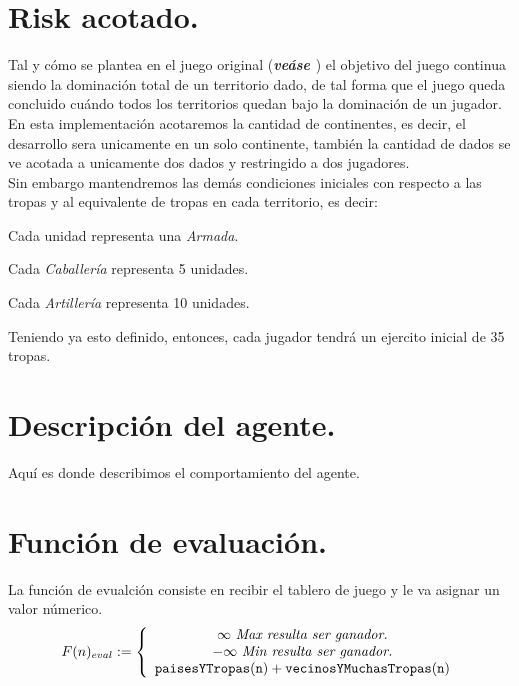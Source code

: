 \documentclass[12pt,twocolumn,draft]{article}
\begin{document}
\section{Risk acotado.}

Tal y c\'omo se plantea en el juego original (\textbf{\textit{ve\'ase \cite{RISK}}}) el objetivo del juego continua siendo la dominaci\'on total de un territorio dado, de tal forma
que el juego queda concluido cu\'ando todos los territorios quedan bajo la dominaci\'on de 
un jugador.\\
En esta implementaci\'on acotaremos la cantidad de continentes, es decir, el desarrollo sera unicamente en un solo continente, tambi\'en la cantidad de dados se ve acotada a unicamente dos dados y restringido a dos jugadores.\\

Sin embargo mantendremos las dem\'as condiciones iniciales con respecto a las tropas y al equivalente de tropas en cada territorio, es decir:
\begin{list}{*}{}
\item Cada unidad representa una \textit{Armada}.
\item Cada \textit{Caballer\'ia} representa 5 unidades.
\item Cada \textit{Artiller\'ia} representa 10 unidades.
\end{list}

Teniendo ya esto definido, entonces, cada jugador tendr\'a un ejercito inicial de 35 tropas.

\section{Descripci\'on del agente.}
Aqu\'i es donde describimos el comportamiento del agente.


\section{Funci\'on de evaluaci\'on.}

La funci\'on de evualci\'on consiste en recibir el tablero de juego y le va asignar un valor n\'umerico.\\

$$ 
F(n)_{eval}:= \left\{\begin{array}{c l}
  \infty\ \textit{Max\ resulta\ ser\ ganador.}\\
  -\infty\ \textit{Min\ resulta\ ser\ ganador.}\\
  \mathtt{paisesYTropas(n)}+\mathtt{vecinosYMuchasTropas(n)}
\end{array}
\right.
$$
\end{document}
